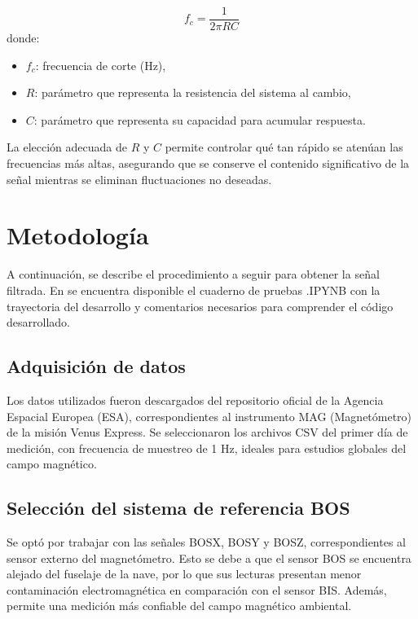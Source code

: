 \documentclass[letterpaper,11pt]{article}
\begin{document}
\begin{equation}
f_c = \frac{1}{2\pi RC}
\end{equation}
donde:

\begin{itemize}
  \item \( f_c \): frecuencia de corte (Hz),
  \item \( R \): parámetro que representa la resistencia del sistema al cambio,
  \item \( C \): parámetro que representa su capacidad para acumular respuesta.
\end{itemize}
\vspace{0.2cm}
La elección adecuada de \( R \) y \( C \) permite controlar qué tan rápido se atenúan las frecuencias más altas, asegurando que se conserve el contenido significativo de la señal mientras se eliminan fluctuaciones no deseadas.

    \section{Metodología}
        A continuación, se describe el procedimiento a seguir para obtener la señal filtrada. En \cite{repogithub} se encuentra disponible el cuaderno de pruebas .IPYNB con la trayectoria del desarrollo y comentarios necesarios para comprender el código desarrollado.
        
        \subsection{Adquisición de datos}
            Los datos utilizados fueron descargados del repositorio oficial de la Agencia Espacial Europea (ESA), correspondientes al instrumento MAG (Magnetómetro) de la misión Venus Express. Se seleccionaron los archivos CSV del primer día de medición, con frecuencia de muestreo de 1 Hz, ideales para estudios globales del campo magnético. 

        \subsection{Selección del sistema de referencia BOS}
Se optó por trabajar con las señales BOSX, BOSY y BOSZ, correspondientes al sensor externo del magnetómetro. Esto se debe a que el sensor BOS se encuentra alejado del fuselaje de la nave, por lo que sus lecturas presentan menor contaminación electromagnética en comparación con el sensor BIS. Además, permite una medición más confiable del campo magnético ambiental. 
\end{document}

